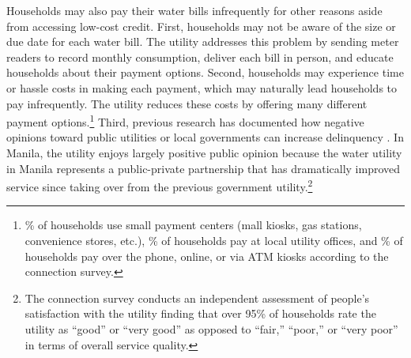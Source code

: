 \documentclass[12pt]{article}
\begin{document}


Households may also pay their water bills infrequently for other reasons aside from accessing low-cost credit.  First, households may not be aware of the size or due date for each water bill.  The utility addresses this problem by sending meter readers to record monthly consumption, deliver each bill in person, and educate households about their payment options.  Second, households may experience time or hassle costs in making each payment, which may naturally lead households to pay infrequently.  The utility reduces these costs by offering many different payment options.\footnote{\unskip\% of households use small payment centers (mall kiosks, gas stations, convenience stores, etc.), \unskip\% of households pay at local utility offices, and \unskip\% of households pay over the phone, online, or via ATM kiosks according to the connection survey.}  Third, previous research has documented how negative opinions toward public utilities or local governments can increase delinquency \citep{szabo2015reducing}.  In Manila, the utility enjoys largely positive public opinion because the water utility in Manila represents a public-private partnership that has dramatically improved service since taking over from the previous government utility.\footnote{The connection survey conducts an independent assessment of people's satisfaction with the utility finding that over 95\% of households rate the utility as ``good'' or ``very good'' as opposed to ``fair,'' ``poor,'' or ``very poor'' in terms of overall service quality.}



\end{document}
